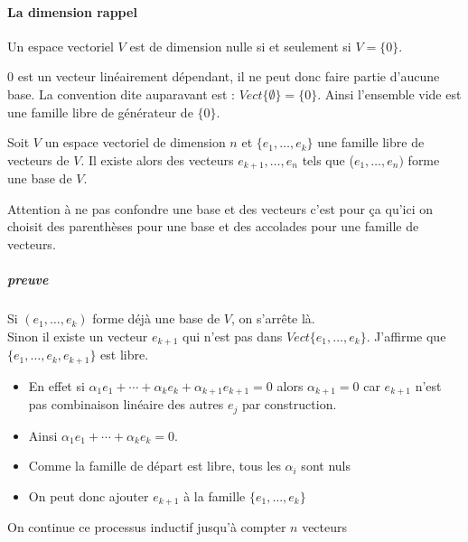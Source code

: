 \paragraph{La dimension rappel}

\begin{definition}
    Un espace vectoriel $V$ est de dimension nulle si et seulement si $V = \{0\}$.
\end{definition}
0 est un vecteur linéairement dépendant, il ne peut donc faire partie d'aucune base. La convention dite auparavant est : $Vect\{\emptyset\} = \{0\}$. Ainsi l'ensemble vide est une famille libre de générateur de $\{0\}$.

\begin{theoreme}
    Soit $V$ un espace vectoriel de dimension $n$ et $\{e_1, \dots, e_k\}$ une famille libre de vecteurs de $V$. Il existe alors des vecteurs $e_{k+1}, \dots, e_n$ tels que ($e_1, \dots, e_n)$ forme une base de $V$.
\end{theoreme}
\begin{framedremark}
    Attention à ne pas confondre une base et des vecteurs c'est pour ça qu'ici on choisit des parenthèses pour une base et des accolades pour une famille de vecteurs.
\end{framedremark}

\subparagraph{preuve} Si $(e_1, \dots, e_k)$ forme déjà une base de $V$, on s'arrête là.\\
Sinon il existe un vecteur $e_{k+1}$ qui n'est pas dans $Vect\{e_1, \dots, e_k\}$. J'affirme que $\{e_1, \dots, e_k, e_{k+1}\}$ est libre.
\\
\begin{itemize}
    \item En effet si $\alpha_1e_1 + \cdots + \alpha_ke_k + \alpha_{k+1}e_{k+1} = 0$ alors $\alpha_{k+1} = 0$ car $e_{k+1}$ n'est pas combinaison linéaire des autres $e_j$ par construction.
    \item Ainsi $\alpha_1e_1 + \cdots + \alpha_ke_k  = 0$.
    \item Comme la famille de départ est libre, tous les $\alpha_i$ sont nuls
    \item On peut donc ajouter $e_{k+1}$ à la famille $\{e_1, \dots, e_k\}$
\end{itemize}
On continue ce processus inductif jusqu'à compter $n$ vecteurs


